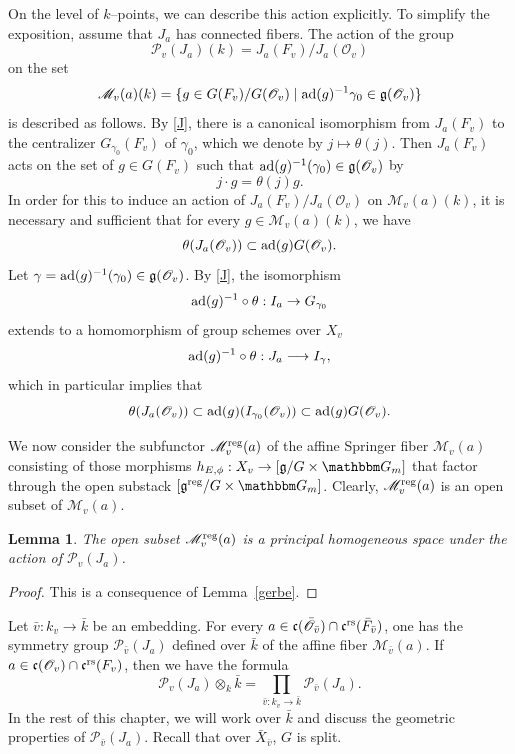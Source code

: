 \documentclass[12pt,english]{smfart}
\numberwithin{equation}{subsection}
\newtheorem{lemma}[equation]{Lemma}
\theoremstyle{remark}
\newcommand\calP{{\mathscr P}}
\newcommand\calM{{\mathscr M}}
\newcommand\calO{{\mathscr O}}
\newcommand\frakg{{\mathfrak g}}
\newcommand\frakc{{\mathfrak c}}
\newcommand\GG{{\mathbbm G}}
\newcommand\ad{{\rm ad}}
\newcommand\rs{{\rm rs}}
\newcommand\reg{{\rm reg}}
\begin{document}
On the level of $k$--points, we can describe this action explicitly. To simplify the exposition, assume that $J_a$ has connected fibers. The action of the group
$$
\calP_v(J_a)(k)=J_a(F_v)/J_a(\calO_v)
$$
on the set
$$
\calM_v(a)(k)=\{g\in G(F_v)/G(\calO_v) \mid \ad(g)^{-1}\gamma_0 \in \frakg(\calO_v)\}
$$
is described as follows. By \ref{J}, there is a canonical isomorphism from $J_a(F_v)$ to the centralizer $G_{\gamma_0}(F_v)$ of $\gamma_0$, which we denote by $j\mapsto \theta(j)$. Then $J_a(F_v)$ acts on the set of $g\in G(F_v)$ such that $\ad(g)^{-1}(\gamma_0)\in \frakg(\calO_v)$ by 
$$
j\cdot g=\theta(j)g.
$$
In order for this to induce an action of $J_a(F_v)/J_a(\calO_v)$ on $\calM_v(a)(k)$, it is necessary and sufficient that for every $g\in \calM_v(a)(k)$, we have
$$
\theta(J_a(\calO_v)) \subset \ad(g) G(\calO_v).
$$
Let $\gamma=\ad(g)^{-1}(\gamma_0)\in \frakg(\calO_v)$. By \ref{J}, the isomorphism
$$
\ad(g)^{-1}\circ\theta : I_a \to G_{\gamma_0}
$$
extends to a homomorphism of group schemes over $X_v$
$$
\ad(g)^{-1}\circ\theta: J_a \longrightarrow I_\gamma,
$$
which in particular implies that
$$
\theta(J_a(\calO_v)) \subset \ad(g)(I_{\gamma_0}(\calO_v)) \subset \ad(g) G(\calO_v).
$$

We now consider the subfunctor $\calM_v^\reg(a)$ of the affine Springer fiber $\calM_v(a)$ consisting of those morphisms $h_{E,\phi}:X_v\to [\frakg/G\times\GG_m]$ that factor through the open substack $[\frakg^\reg/G\times\GG_m]$. Clearly, $\calM_v^\reg(a)$ is an open subset of $\calM_v(a)$.

\begin{lemma}
The open subset $\calM_v^\reg(a)$ is a principal homogeneous space under the action of $\calP_v(J_a)$.
\end{lemma}

\begin{proof}
This is a consequence of Lemma~\ref{gerbe}.
\end{proof}

Let $\bar{v}: k_v \to \bar{k}$ be an embedding. For every $a\in \frakc(\bar\calO_{\bar{v}})\cap \frakc^\rs(\bar F_{\bar{v}})$, one has the symmetry group $\calP_{\bar{v}}(J_a)$ defined over $\bar{k}$ of the affine fiber $\calM_{\bar{v}}(a)$. If $a\in \frakc(\calO_v)\cap \frakc^\rs(F_v)$, then we have the formula
$$
\calP_v(J_a)\otimes_k \bar{k}=\prod_{\bar{v}:k_v\rightarrow \bar{k}} \calP_{\bar{v}}(J_a).
$$
In the rest of this chapter, we will work over $\bar{k}$ and discuss the geometric properties of $\calP_{\bar{v}}(J_a)$. Recall that over $\bar X_{\bar{v}}$, $G$ is split.
\end{document}
